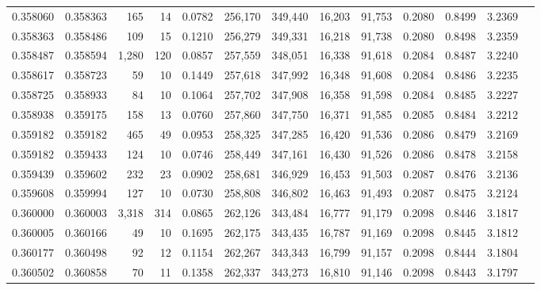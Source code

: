 \begin{tabular}{rrrrrrrrrrrrr}
0.358060 & 0.358363 &   165 &  14 &                                     0.0782 & 256,170 & 349,440 &  16,203 &  91,753 & 0.2080 & 0.8499 & 3.2369 \\
0.358363 & 0.358486 &   109 &  15 &                                     0.1210 & 256,279 & 349,331 &  16,218 &  91,738 & 0.2080 & 0.8498 & 3.2359 \\
0.358487 & 0.358594 & 1,280 & 120 &                                     0.0857 & 257,559 & 348,051 &  16,338 &  91,618 & 0.2084 & 0.8487 & 3.2240 \\
0.358617 & 0.358723 &    59 &  10 &                                     0.1449 & 257,618 & 347,992 &  16,348 &  91,608 & 0.2084 & 0.8486 & 3.2235 \\
0.358725 & 0.358933 &    84 &  10 &                                     0.1064 & 257,702 & 347,908 &  16,358 &  91,598 & 0.2084 & 0.8485 & 3.2227 \\
0.358938 & 0.359175 &   158 &  13 &                                     0.0760 & 257,860 & 347,750 &  16,371 &  91,585 & 0.2085 & 0.8484 & 3.2212 \\
0.359182 & 0.359182 &   465 &  49 &                                     0.0953 & 258,325 & 347,285 &  16,420 &  91,536 & 0.2086 & 0.8479 & 3.2169 \\
0.359182 & 0.359433 &   124 &  10 &                                     0.0746 & 258,449 & 347,161 &  16,430 &  91,526 & 0.2086 & 0.8478 & 3.2158 \\
0.359439 & 0.359602 &   232 &  23 &                                     0.0902 & 258,681 & 346,929 &  16,453 &  91,503 & 0.2087 & 0.8476 & 3.2136 \\
0.359608 & 0.359994 &   127 &  10 &                                     0.0730 & 258,808 & 346,802 &  16,463 &  91,493 & 0.2087 & 0.8475 & 3.2124 \\
0.360000 & 0.360003 & 3,318 & 314 &                                     0.0865 & 262,126 & 343,484 &  16,777 &  91,179 & 0.2098 & 0.8446 & 3.1817 \\
0.360005 & 0.360166 &    49 &  10 &                                     0.1695 & 262,175 & 343,435 &  16,787 &  91,169 & 0.2098 & 0.8445 & 3.1812 \\
0.360177 & 0.360498 &    92 &  12 &                                     0.1154 & 262,267 & 343,343 &  16,799 &  91,157 & 0.2098 & 0.8444 & 3.1804 \\
0.360502 & 0.360858 &    70 &  11 &                                     0.1358 & 262,337 & 343,273 &  16,810 &  91,146 & 0.2098 & 0.8443 & 3.1797 \\

\end{tabular}
